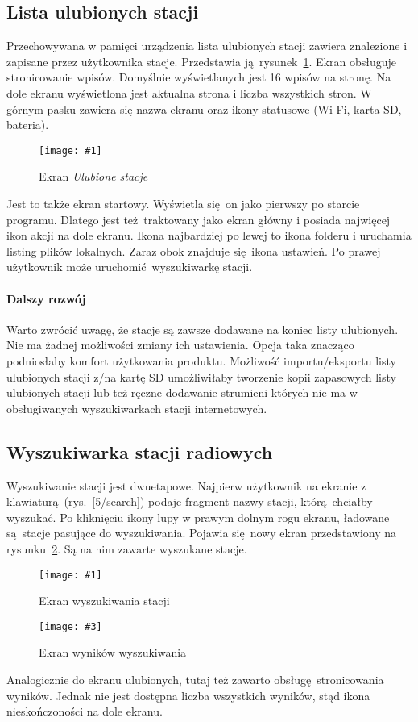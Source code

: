 \documentclass[polish]{aghengthesis}
\newcommand{\imgint}[4]{
	\begin{figure}[{#4}]
		\centering
		\texttt{[image: \#1]}
		\caption{#2}
		\label{#1}
	\end{figure}
}
\newcommand{\imgh}[3]{\imgint{#1}{#2}{#3}{H}}
\newcommand{\imgintss}[5]{
	\begin{figure}[{#5}]
		\centering
		\begin{minipage}{.45\textwidth}
			\centering
			\texttt{[image: \#1]}
			\caption{#2}
			\label{#1}
		\end{minipage}%
		\hfill
		\begin{minipage}{.45\textwidth}
			\centering
			\texttt{[image: \#3]}
			\caption{#4}
			\label{#3}
		\end{minipage}
	\end{figure}
}
\newcommand{\imghss}[4]{\imgintss{#1}{#2}{#3}{#4}{H}}
\begin{document}
		\subsection{Lista ulubionych stacji}
			Przechowywana w pamięci urządzenia lista ulubionych stacji zawiera znalezione i zapisane przez użytkownika stacje. Przedstawia ją rysunek~\ref{5/fav}.
			Ekran obsługuje stronicowanie wpisów. Domyślnie wyświetlanych jest 16 wpisów na stronę. Na dole ekranu wyświetlona jest aktualna strona i liczba wszystkich stron.
			W górnym pasku zawiera się nazwa ekranu oraz ikony statusowe (Wi-Fi, karta SD, bateria).
			
			\imgh{5/fav}{Ekran \textit{Ulubione stacje}}{0.5}
			
			Jest to także ekran startowy. Wyświetla się on jako pierwszy po starcie programu. Dlatego jest też traktowany jako ekran główny i posiada najwięcej ikon akcji na dole ekranu.
			Ikona najbardziej po lewej to ikona folderu i uruchamia listing plików lokalnych. Zaraz obok znajduje się ikona ustawień. Po prawej użytkownik może uruchomić wyszukiwarkę stacji.
			
			\paragraph{Dalszy rozwój}
				Warto zwrócić uwagę, że stacje są zawsze dodawane na koniec listy ulubionych. Nie ma żadnej możliwości zmiany ich ustawienia. Opcja taka znacząco podniosłaby komfort użytkowania produktu. Możliwość importu/eksportu listy ulubionych stacji z/na kartę SD umożliwiłaby tworzenie kopii zapasowych listy ulubionych stacji lub też ręczne dodawanie strumieni których nie ma w obsługiwanych wyszukiwarkach stacji internetowych.
			
		\subsection{Wyszukiwarka stacji radiowych}
			Wyszukiwanie stacji jest dwuetapowe. Najpierw użytkownik na ekranie z klawiaturą (rys.~\ref{5/search}) podaje fragment nazwy stacji, którą chciałby wyszukać. Po kliknięciu ikony lupy w prawym dolnym rogu ekranu, ładowane są stacje pasujące do wyszukiwania. Pojawia się nowy ekran przedstawiony na rysunku~\ref{5/searchres}. Są na nim zawarte wyszukane stacje.
			
			\imghss{5/search}{Ekran wyszukiwania stacji}{5/searchres}{Ekran wyników wyszukiwania}
			
			Analogicznie do ekranu ulubionych, tutaj też zawarto obsługę stronicowania wyników. Jednak nie jest dostępna liczba wszystkich wyników, stąd ikona nieskończoności na dole ekranu.
			
\end{document}
